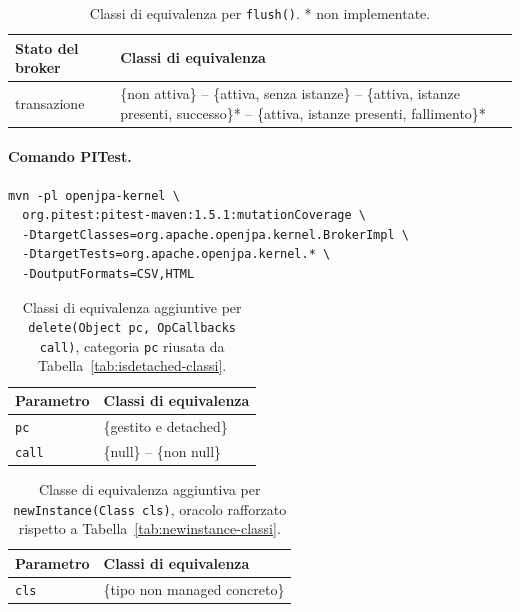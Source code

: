 \begin{table}[H]
\centering
\begin{tabularx}{\textwidth}{>{\raggedright\arraybackslash}p{} >{\raggedright\arraybackslash}X}
\toprule
Stato del broker & Classi di equivalenza \\
\midrule
transazione & \{non attiva\} -- \{attiva, senza istanze\} -- \{attiva, istanze presenti, successo\}*
-- \{attiva, istanze presenti, fallimento\}* \\
\bottomrule
\end{tabularx}
\caption{Classi di equivalenza per \texttt{flush()}. * non implementate.}
\label{tab:flush-classi}
\end{table}

\paragraph*{Comando PITest.}
\label{cmd:pitest-brokerimpl}
\begin{lstlisting}
mvn -pl openjpa-kernel \
  org.pitest:pitest-maven:1.5.1:mutationCoverage \
  -DtargetClasses=org.apache.openjpa.kernel.BrokerImpl \
  -DtargetTests=org.apache.openjpa.kernel.* \
  -DoutputFormats=CSV,HTML
\end{lstlisting}

\begin{table}[H]
\centering
\begin{tabularx}{\textwidth}{>{\raggedright\arraybackslash}p{} >{\raggedright\arraybackslash}X}
\toprule
Parametro & Classi di equivalenza \\
\midrule
\texttt{pc} & \{gestito e detached\} \\
\texttt{call} & \{null\} -- \{non null\} \\
\bottomrule
\end{tabularx}
\caption{Classi di equivalenza aggiuntive per \texttt{delete(Object pc, OpCallbacks call)},
categoria \texttt{pc} riusata da Tabella~\ref{tab:isdetached-classi}.}
\label{tab:delete2-classi}
\end{table}

\begin{table}[H]
\centering
\begin{tabularx}{\textwidth}{>{\raggedright\arraybackslash}p{0.38\textwidth} >{\raggedright\arraybackslash}X}
\toprule
Parametro & Classi di equivalenza \\
\midrule
\texttt{cls} & \{tipo non managed concreto\} \\
\bottomrule
\end{tabularx}
\caption{Classe di equivalenza aggiuntiva per \texttt{newInstance(Class cls)}, oracolo rafforzato
rispetto a Tabella~\ref{tab:newinstance-classi}.}
\label{tab:newinstance2-classi}
\end{table}

